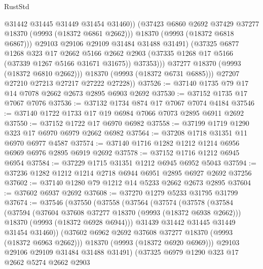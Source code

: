 \begin{lexlean}{RustStd}
\begin{coremodule}
                        @31442
                        @31445
                        @31449
                        @31454
                        @31460))
                    (@37423 @6860 @2692 @37429 @37277 @18370 (@9993 (@18372 @6861 @2662)))
                    @18370
                    (@9993 (@18372 @6818 @6867)))
                  @29103
                  @29106
                  @29109
                  @31484
                  @31488
                  @31491)
                (@37325
                  @6877
                  @1268
                  @323
                  @17
                  @2662
                  @5166
                  @2662
                  @2903
                  (@37335 @1268 @17 @5166 (@37339 @1267 @5166 @31671 @31675))
                  @37353)))
            @37277
            @18370
            (@9993 (@18372 @6810 @2662)))
          @18370
          (@9993 (@18372 @6731 @6885)))
        @27207
        @27210
        @27213
        @27217
        @27222
        @27228))
@37526 := @37140 @1735 @79 @17 @14 @7078 @2662 @2673 @2895 @6903 @2692
@37530 := @37152 @1735 @17 @7067 @7076
@37536 := @37132 @1734 @874 @17 @7067 @7074 @4184
@37546 := @37140 @1722 @1733 @17 @19 @6984 @7066 @7073 @2895 @6911 @2692
@37550 := @37152 @1722 @17 @6970 @6982
@37558 := @37199 @1719 @1290 @323 @17 @6970 @6979 @2662 @6982
@37564 := @37208 @1718 @31351 @11 @6970 @6977 @4587
@37574 := @37140 @1716 @1282 @1212 @1214 @6956 @6969 @6976 @2895 @6919 @2692
@37578 := @37152 @1716 @1212 @6945 @6954
@37584 := @37229 @1715 @31351 @1212 @6945 @6952 @5043
@37594 := @37236 @1282 @1212 @1214 @2718 @6944 @6951 @2895 @6927 @2692 @37256
@37602 := @37140 @1280 @79 @1212 @14 @5233 @2662 @2673 @2895
@37604 := @37602 @6937 @2692
@37608 := @37270 @1279 @5233 @31795 @31799
@37674 := @37546
    (@37550
      (@37558
        (@37564
          (@37574
            (@37578
              (@37584
                (@37594
                  (@37604 @37608 @37277 @18370 (@9993 (@18372 @6938 @2662)))
                  @18370
                  (@9993 (@18372 @6928 @6944)))
                @31439
                @31442
                @31445
                @31449
                @31454
                @31460))
            (@37602 @6962 @2692 @37608 @37277 @18370 (@9993 (@18372 @6963 @2662)))
            @18370
            (@9993 (@18372 @6920 @6969)))
          @29103
          @29106
          @29109
          @31484
          @31488
          @31491)
        (@37325
          @6979
          @1290
          @323
          @17
          @2662
          @5274
          @2662
          @2903

\end{coremodule}
\end{lexlean}
